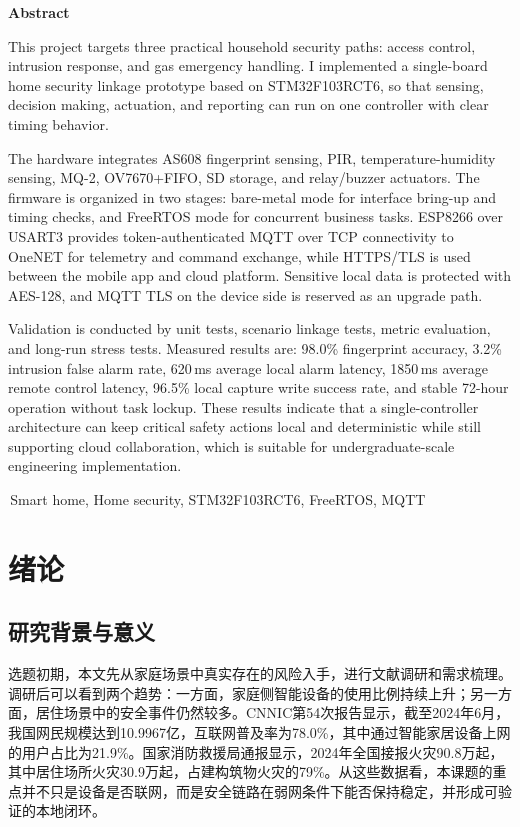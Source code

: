 \documentclass[UTF8,12pt,a4paper,oneside]{ctexbook}
\numberwithin{equation}{chapter}
\let\cite\supercite
\begin{document}
\vspace{0.5\baselineskip}
\clearpage
{}
{}
\begin{center}
{\bfseries{}Abstract}
\end{center}
\begin{sloppypar}
This project targets three practical household security paths: access control, intrusion response, and gas emergency handling. I implemented a single-board home security linkage prototype based on STM32F103RCT6, so that sensing, decision making, actuation, and reporting can run on one controller with clear timing behavior.

The hardware integrates AS608 fingerprint sensing, PIR, temperature-humidity sensing, MQ-2, OV7670+FIFO, SD storage, and relay/buzzer actuators. The firmware is organized in two stages: bare-metal mode for interface bring-up and timing checks, and FreeRTOS mode for concurrent business tasks. ESP8266 over USART3 provides token-authenticated MQTT over TCP connectivity to OneNET for telemetry and command exchange, while HTTPS/TLS is used between the mobile app and cloud platform. Sensitive local data is protected with AES-128, and MQTT TLS on the device side is reserved as an upgrade path.

Validation is conducted by unit tests, scenario linkage tests, metric evaluation, and long-run stress tests. Measured results are: 98.0\% fingerprint accuracy, 3.2\% intrusion false alarm rate, 620\,ms average local alarm latency, 1850\,ms average remote control latency, 96.5\% local capture write success rate, and stable 72-hour operation without task lockup. These results indicate that a single-controller architecture can keep critical safety actions local and deterministic while still supporting cloud collaboration, which is suitable for undergraduate-scale engineering implementation.
\end{sloppypar}

\vspace{1\baselineskip}
\,Smart home, Home security, STM32F103RCT6, FreeRTOS, MQTT

\mainmatter
\pagestyle{fancy}
\setcounter{page}{1}

\chapter{绪论}
\section{研究背景与意义}
选题初期，本文先从家庭场景中真实存在的风险入手，进行文献调研和需求梳理。调研后可以看到两个趋势：一方面，家庭侧智能设备的使用比例持续上升；另一方面，居住场景中的安全事件仍然较多。CNNIC第54次报告显示，截至2024年6月，我国网民规模达到10.9967亿，互联网普及率为78.0\%，其中通过智能家居设备上网的用户占比为21.9\%\cite{cnnic54_2024}。国家消防救援局通报显示，2024年全国接报火灾90.8万起，其中居住场所火灾30.9万起，占建构筑物火灾的79\%\cite{china_fire_2024}。从这些数据看，本课题的重点并不只是设备是否联网，而是安全链路在弱网条件下能否保持稳定，并形成可验证的本地闭环。
\end{document}
